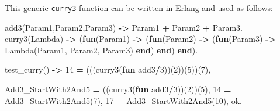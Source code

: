 \documentclass[
]{book}
\newenvironment{Shaded}{\begin{snugshade}}{\end{snugshade}}
\newcommand{\CharTok}[1]{\textcolor[rgb]{0.31,0.60,0.02}{#1}}
\newcommand{\DecValTok}[1]{\textcolor[rgb]{0.00,0.00,0.81}{#1}}
\newcommand{\FunctionTok}[1]{\textcolor[rgb]{0.00,0.00,0.00}{#1}}
\newcommand{\KeywordTok}[1]{\textcolor[rgb]{0.13,0.29,0.53}{\textbf{#1}}}
\newcommand{\OperatorTok}[1]{\textcolor[rgb]{0.81,0.36,0.00}{\textbf{#1}}}
\newcommand{\VariableTok}[1]{\textcolor[rgb]{0.00,0.00,0.00}{#1}}
\begin{document}
This generic \texttt{curry3} function can be written in Erlang and used as follows:

\begin{Shaded}
\begin{Highlighting}[]
\FunctionTok{add3(}\VariableTok{Param1}\FunctionTok{,}\VariableTok{Param2}\FunctionTok{,}\VariableTok{Param3}\FunctionTok{)} \OperatorTok{{-}\textgreater{}} \VariableTok{Param1} \OperatorTok{+} \VariableTok{Param2} \OperatorTok{+} \VariableTok{Param3}\FunctionTok{.}
\FunctionTok{curry3(}\VariableTok{Lambda}\FunctionTok{)} \OperatorTok{{-}\textgreater{}} \FunctionTok{(}\KeywordTok{fun}\FunctionTok{(}\VariableTok{Param1}\FunctionTok{)} \OperatorTok{{-}\textgreater{}} \FunctionTok{(}\KeywordTok{fun}\FunctionTok{(}\VariableTok{Param2}\FunctionTok{)} \OperatorTok{{-}\textgreater{}} \FunctionTok{(}\KeywordTok{fun}\FunctionTok{(}\VariableTok{Param3}\FunctionTok{)} \OperatorTok{{-}\textgreater{}} \VariableTok{Lambda}\FunctionTok{(}\VariableTok{Param1}\FunctionTok{,} \VariableTok{Param2}\FunctionTok{,} \VariableTok{Param3}\FunctionTok{)} \KeywordTok{end}\FunctionTok{)} \KeywordTok{end}\FunctionTok{)} \KeywordTok{end}\FunctionTok{).}

\FunctionTok{test\_curry()} \OperatorTok{{-}\textgreater{}}
    \DecValTok{14} \OperatorTok{=} \FunctionTok{(((curry3(}\KeywordTok{fun} \CharTok{add3}\OperatorTok{/}\DecValTok{3}\FunctionTok{))(}\DecValTok{2}\FunctionTok{))(}\DecValTok{5}\FunctionTok{))(}\DecValTok{7}\FunctionTok{),}

    \VariableTok{Add3\_StartWith2And5} \OperatorTok{=} \FunctionTok{((curry3(}\KeywordTok{fun} \CharTok{add3}\OperatorTok{/}\DecValTok{3}\FunctionTok{))(}\DecValTok{2}\FunctionTok{))(}\DecValTok{5}\FunctionTok{),}
    \DecValTok{14} \OperatorTok{=} \VariableTok{Add3\_StartWith2And5}\FunctionTok{(}\DecValTok{7}\FunctionTok{),}
    \DecValTok{17} \OperatorTok{=} \VariableTok{Add3\_StartWith2And5}\FunctionTok{(}\DecValTok{10}\FunctionTok{),}
    \CharTok{ok}\FunctionTok{.}
\end{Highlighting}
\end{Shaded}
\end{document}
